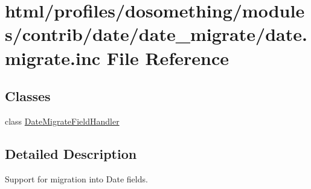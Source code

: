 \hypertarget{date_8migrate_8inc}{
\section{html/profiles/dosomething/modules/contrib/date/date\_\-migrate/date.migrate.inc File Reference}
\label{date_8migrate_8inc}
}
\subsection*{Classes}
\begin{DoxyCompactItemize}
\item 
class \hyperlink{classDateMigrateFieldHandler}{DateMigrateFieldHandler}
\end{DoxyCompactItemize}


\subsection{Detailed Description}
Support for migration into Date fields. 